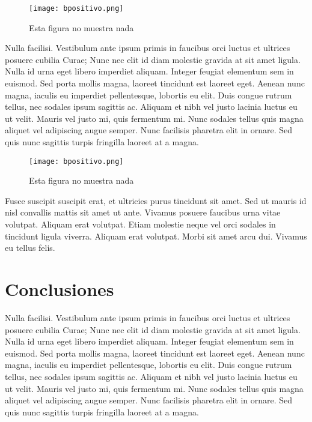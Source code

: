 \documentclass[twocolumn,a4paper,10pt]{article}
\begin{document}
\begin{figure}
    \center \texttt{[image: bpositivo.png]}
    \caption{Esta figura no muestra nada}
\end{figure}

Nulla facilisi. Vestibulum ante ipsum primis in faucibus orci luctus et ultrices posuere cubilia Curae; Nunc nec elit id diam molestie gravida at sit amet ligula. Nulla id urna eget libero imperdiet aliquam. Integer feugiat elementum sem in euismod. Sed porta mollis magna, laoreet tincidunt est laoreet eget. Aenean nunc magna, iaculis eu imperdiet pellentesque, lobortis eu elit. Duis congue rutrum tellus, nec sodales ipsum sagittis ac. Aliquam et nibh vel justo lacinia luctus eu ut velit. Mauris vel justo mi, quis fermentum mi. Nunc sodales tellus quis magna aliquet vel adipiscing augue semper. Nunc facilisis pharetra elit in ornare. Sed quis nunc sagittis turpis fringilla laoreet at a magna.
\begin{figure}
    \center \texttt{[image: bpositivo.png]}
    \caption{Esta figura no muestra nada}
\end{figure}

Fusce suscipit suscipit erat, et ultricies purus tincidunt sit amet. Sed ut mauris id nisl convallis mattis sit amet ut ante. Vivamus posuere faucibus urna vitae volutpat. Aliquam erat volutpat. Etiam molestie neque vel orci sodales in tincidunt ligula viverra. Aliquam erat volutpat. Morbi sit amet arcu dui. Vivamus eu tellus felis.

\section{Conclusiones}
Nulla facilisi. Vestibulum ante ipsum primis in faucibus orci luctus et ultrices posuere cubilia Curae; Nunc nec elit id diam molestie gravida at sit amet ligula. Nulla id urna eget libero imperdiet aliquam. Integer feugiat elementum sem in euismod. Sed porta mollis magna, laoreet tincidunt est laoreet eget. Aenean nunc magna, iaculis eu imperdiet pellentesque, lobortis eu elit. Duis congue rutrum tellus, nec sodales ipsum sagittis ac. Aliquam et nibh vel justo lacinia luctus eu ut velit. Mauris vel justo mi, quis fermentum mi. Nunc sodales tellus quis magna aliquet vel adipiscing augue semper. Nunc facilisis pharetra elit in ornare. Sed quis nunc sagittis turpis fringilla laoreet at a magna.
\end{document}
